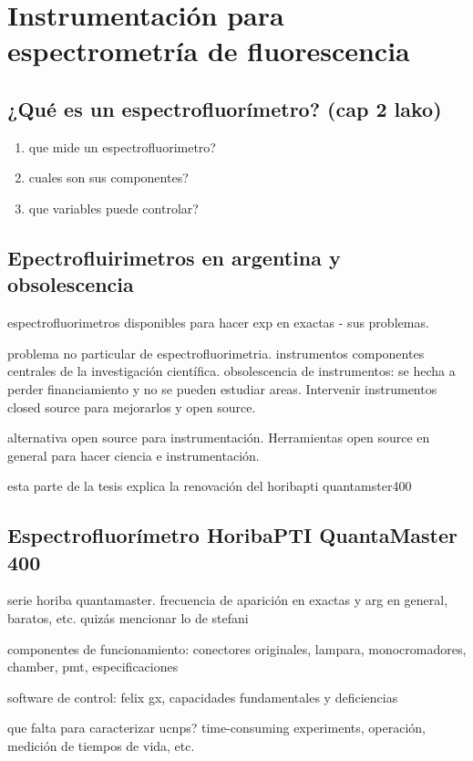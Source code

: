 
\section{Instrumentación para espectrometría de fluorescencia}


\subsection{¿Qué es un espectrofluorímetro? (cap 2 lako)}

\begin{enumerate}
    \item que mide un espectrofluorimetro?
    \item cuales son sus componentes?
    \item que variables puede controlar?
\end{enumerate}

\subsection{Epectrofluirimetros en argentina y obsolescencia}

espectrofluorimetros disponibles para hacer exp en exactas - sus problemas.

problema no particular de espectrofluorimetria. instrumentos componentes centrales de la investigación científica. obsolescencia de instrumentos: se hecha a perder financiamiento y no se pueden estudiar areas. Intervenir instrumentos closed source para mejorarlos y open source.

alternativa open source para instrumentación. Herramientas open source en general para hacer ciencia e instrumentación.

esta parte de la tesis explica la renovación del horibapti quantamster400


\subsection{Espectrofluorímetro HoribaPTI QuantaMaster 400}

serie horiba quantamaster. frecuencia de aparición en exactas y arg en general, baratos, etc. quizás mencionar lo de stefani

componentes de funcionamiento: conectores originales, lampara, monocromadores, chamber, pmt, especificaciones

software de control: felix gx, capacidades fundamentales y deficiencias

que falta para caracterizar ucnps? time-consuming experiments, operación, medición de tiempos de vida, etc.

